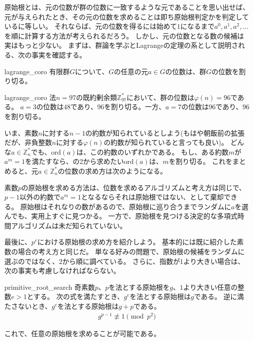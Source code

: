 原始根とは、元の位数が群の位数に一致するような元であることを思い出せば、元が与えられたとき、その元の位数を求めることは即ち原始根判定かを判定しているに等しい。
それならば、元の位数を得るには始めて$1$になるまで$a^0, a^1, a^2, \ldots$を順に計算する方法が考えられるだろう。
しかし、元の位数となる数の候補は実はもっと少ない。
まずは、群論を学ぶとLagrangeの定理の系として説明される、次の事実を確認する。

\begin{Prop}{}{lagrange_coro}
有限群$G$について、$G$の任意の元$a\in G$の位数は、群$G$の位数を割り切る。
\end{Prop}

\begin{Exam}{}{lagrange_coro}
法$n=97$の既約剰余類$\mathbb{Z}_{97}^*$において、群の位数は$\varphi(n)=96$である。
$a=3$の位数は$48$であり、$96$を割り切る。一方、$a=7$の位数は$96$であり、$96$を割り切る。
\end{Exam}

いま、素数$n$に対する$n-1$の約数が知られているとしよう(もはや朝飯前の拡張だが、非負整数$n$に対する$\varphi(n)$の約数が知られていると言っても良い)。
どんな$a\in\mathbb{Z}_n^*$でも、$\mbox{ord}(a)$は、この約数のいずれかである。
もし、ある約数$m$が$a^m=1$を満たすなら、の2から求めたい$\mbox{ord}(a)$は、$m$を割り切る。
これをまとめると、元$a \in \mathbb{Z}_n^*$の位数の求め方は次のようになる。


素数$p$の原始根を求める方法は、位数を求めるアルゴリズムと考え方は同じで、$p-1$以外の約数で$a^{m}=1$となるならそれは原始根ではない、として棄却できる。
原始根はそれなりの数があるので、原始根に巡り合うまでランダムに$a$を選んでも、実用上すぐに見つかる。
一方で、原始根を見つける決定的な多項式時間アルゴリズムは未だ知られていない。

最後に、$p^e$における原始根の求め方を紹介しよう。
基本的には既に紹介した素数の場合の考え方と同じだ。
単なる好みの問題で、原始根の候補をランダムに選ぶのではなく、2から順に調べている。
さらに、指数が1より大きい場合は、次の事実も考慮しなければならない。

\begin{Prop}{}{primitive_root_search}
奇素数$p$、$p$を法とする原始根を$g$、$1$より大きい任意の整数$e>1$とする。
次の式を満たすとき、$g^e$を法とする原始根は$g$である。
逆に満たさないとき、$g^e$を法とする原始根は$g+p$である。
\begin{align*}
g^{p-1} \not\equiv 1 \pmod{p^2}
\end{align*}
\end{Prop}

これで、任意の原始根を求めることが可能である。

